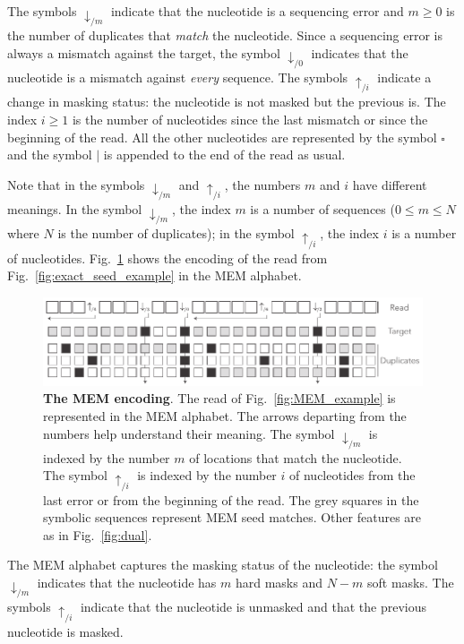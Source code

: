 \documentclass{article}
\begin{document}
The symbols $\downarrow_{/m}$ indicate that the nucleotide is a sequencing
error and $m \geq 0$ is the number of duplicates that \emph{match} the
nucleotide. Since a sequencing error is always a mismatch against the
target, the symbol $\downarrow_{/0}$ indicates that the nucleotide is a
mismatch against \emph{every} sequence. The symbols $\uparrow_{/i}$
indicate a change in masking status: the nucleotide is not masked but the
previous is. The index $i \geq 1$ is the number of nucleotides since the
last mismatch or since the beginning of the read. All the other
nucleotides are represented by the symbol $\square$ and the symbol $|$ is
appended to the end of the read as usual.

Note that in the symbols $\downarrow_{/m}$ and $\uparrow_{/i}$, the
numbers $m$ and $i$ have different meanings. In the symbol
$\downarrow_{/m}$, the index $m$ is a number of sequences ($0 \leq m \leq
N$ where $N$ is the number of duplicates); in the symbol $\uparrow_{/i}$,
the index $i$ is a number of nucleotides. Fig.~\ref{fig:sketch_extended}
shows the encoding of the read from Fig.~\ref{fig:exact_seed_example} in
the MEM alphabet.

\begin{figure}[h]
\centering
\includegraphics[scale=.84]{sketch_extended.pdf}
\caption{\textbf{The MEM encoding}.
The read of Fig.~\ref{fig:MEM_example} is represented in the MEM alphabet.
The arrows departing from the numbers help understand their meaning. The
symbol $\downarrow_{/m}$ is indexed by the number $m$ of locations that
match the nucleotide. The symbol $\uparrow_{/i}$ is indexed by the number
$i$ of nucleotides from the last error or from the beginning of the read.
The grey squares in the symbolic sequences represent MEM seed matches.
Other features are as in Fig.~\ref{fig:dual}.}
\label{fig:sketch_extended}
\end{figure}

The MEM alphabet captures the masking status of the nucleotide: the symbol
$\downarrow_{/m}$ indicates that the nucleotide has $m$ hard masks and
$N-m$ soft masks. The symbols $\uparrow_{/i}$ indicate that the nucleotide
is unmasked and that the previous nucleotide is masked.
\end{document}
